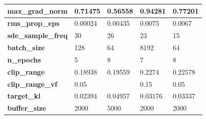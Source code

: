\documentclass[../xlapes02]{subfiles}
\begin{document}
\begin{table}[H]
{\begin{tabular}{|l||l|l||l|l|}
                \textbf{max\_grad\_norm}           & 0.71475                                      & 0.56558                                      & 0.94281                                      & 0.77201                                      \\ \hline
                \textbf{rms\_prop\_eps}            & 0.00024                                      & 0.00435                                      & 0.0075                                       & 0.0067                                       \\ \hline
                \textbf{sde\_sample\_freq}         & 30                                           & 26                                           & 23                                           & 15                                           \\ \hline
                \textbf{batch\_size}               & 128                                          & 64                                           & 8192                                         & 64                                           \\ \hline
                \textbf{n\_epochs}                 & 5                                            & 8                                            & 7                                            & 8                                            \\ \hline
                \textbf{clip\_range}               & 0.18938                                      & 0.19559                                      & 0.2274                                       & 0.22578                                      \\ \hline
                \textbf{clip\_range\_vf}           & 0.05                                         & ~                                            & 0.15                                         & 0.05                                         \\ \hline
                \textbf{target\_kl}                & 0.02394                                      & 0.04957                                      & 0.03176                                      & 0.03337                                      \\ \hline
                \textbf{buffer\_size}              & 2000                                         & 5000                                         & 2000                                         & 2000                                         \\ \hline

\end{tabular}}
\end{table}
\end{document}
